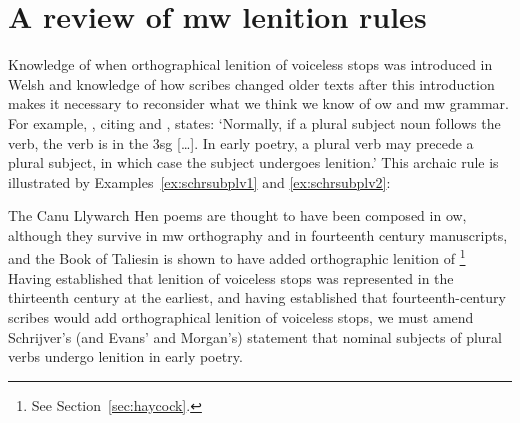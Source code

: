 \section{A review of \gls{mw} lenition rules}
\label{sec:cons-other-ideas}
Knowledge of when orthographical lenition of voiceless stops was introduced in Welsh and knowledge of how scribes changed older texts after this introduction makes it necessary to reconsider what we think we know of \gls{ow} and \gls{mw} grammar. For example, \textcite[2]{schrijver_free_2010}, citing \textcite[18, 179]{evans_grammar_1964} and \textcite[193n]{morgan_y_1952}, states:
`Normally, if a plural subject noun follows the verb, the verb is in the 3sg […]. In early poetry, a plural verb may precede a plural subject, in which case the subject undergoes lenition.' This  archaic rule is illustrated by Examples~\ref{ex:schrsubplv1} and \ref{ex:schrsubplv2}:
\begin{mwl}
\end{mwl}

The Canu Llywarch Hen poems are thought to have been composed in \gls{ow}, although they survive in \gls{mw} orthography and in fourteenth century manuscripts, and the Book of Taliesin is shown to have added orthographic lenition of \footnote{See Section~\ref{sec:haycock}.} Having established that  lenition of voiceless stops was represented in the thirteenth century at the earliest, and having established that fourteenth-century scribes would add orthographical lenition of voiceless stops, we must amend Schrijver's (and Evans' and Morgan's) statement that nominal subjects of plural verbs undergo lenition in early poetry.

